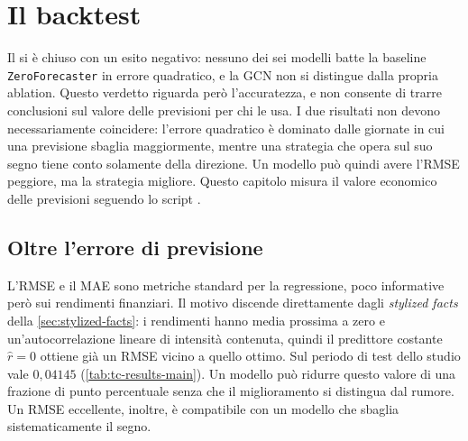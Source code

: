 \chapter{Il backtest}
\label{ch:backtest}

Il  si è chiuso con un esito negativo: nessuno dei sei modelli batte la baseline \texttt{ZeroForecaster} in errore quadratico, e la GCN non si distingue dalla propria ablation. Questo verdetto riguarda però l'accuratezza, e non consente di trarre conclusioni sul valore delle previsioni per chi le usa. I due risultati non devono necessariamente coincidere: l'errore quadratico è dominato dalle giornate in cui una previsione sbaglia maggiormente, mentre una strategia che opera sul suo segno tiene conto solamente della direzione. Un modello può quindi avere l'RMSE peggiore, ma la strategia migliore. Questo capitolo misura il valore economico delle previsioni seguendo lo script .

\section{Oltre l'errore di previsione}
\label{sec:bt-beyond-accuracy}

L'RMSE e il MAE sono metriche standard per la regressione, poco informative però sui rendimenti finanziari. Il motivo discende direttamente dagli \emph{stylized facts} della \cref{sec:stylized-facts}: i rendimenti hanno media prossima a zero e un'autocorrelazione lineare di intensità contenuta, quindi il predittore costante $\hat r=0$ ottiene già un RMSE vicino a quello ottimo. Sul periodo di test dello studio vale $0{,}04145$ (\cref{tab:tc-results-main}). Un modello può ridurre questo valore di una frazione di punto percentuale senza che il miglioramento si distingua dal rumore. Un RMSE eccellente, inoltre, è compatibile con un modello che sbaglia sistematicamente il segno.

